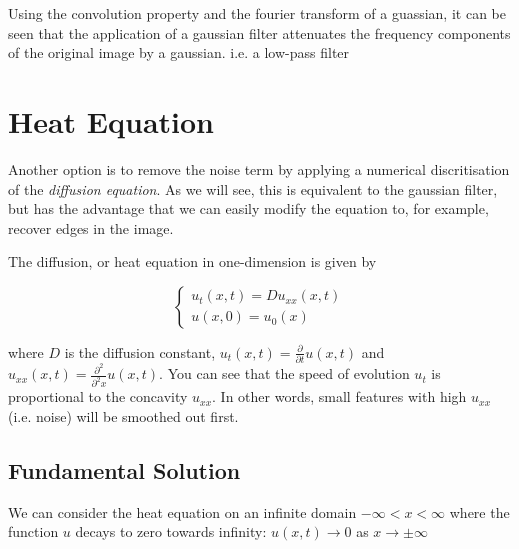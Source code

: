 \documentclass[11pt,a4paper,noindent]{article}
\begin{document}
Using the convolution property and the fourier transform of a guassian, it can be seen that the application of a gaussian filter attenuates the frequency components of the original image by a gaussian. i.e. a low-pass filter

\section{Heat Equation}

Another option is to remove the noise term by applying a numerical discritisation of the \emph{diffusion equation}. As we will see, this is equivalent to the gaussian filter, but has the advantage that we can easily modify the equation to, for example, recover edges in the image.

The diffusion, or heat equation in one-dimension is given by

\begin{equation}\label{eq:diffusion}
\left\lbrace \begin{array}{c}
u_t(x,t) = D u_{xx}(x,t) \\
u(x,0) = u_0(x)
\end{array}
\right.
\end{equation}

where $D$ is the diffusion constant, $u_t(x,t)=\frac{\partial}{\partial t} u(x,t)$ and $u_{xx}(x,t) =  \frac{\partial^2}{\partial^2 x} u(x,t)$. You can see that the speed of evolution $u_t$ is proportional to the concavity $u_{xx}$. In other words, small features with high $u_{xx}$ (i.e. noise) will be smoothed out first.

\subsection{Fundamental Solution}

We can consider the heat equation on an infinite domain $-\infty < x < \infty$ where the function $u$ decays to zero towards infinity: $u(x,t) \rightarrow 0$ as $x \rightarrow \pm \infty$
\end{document}
